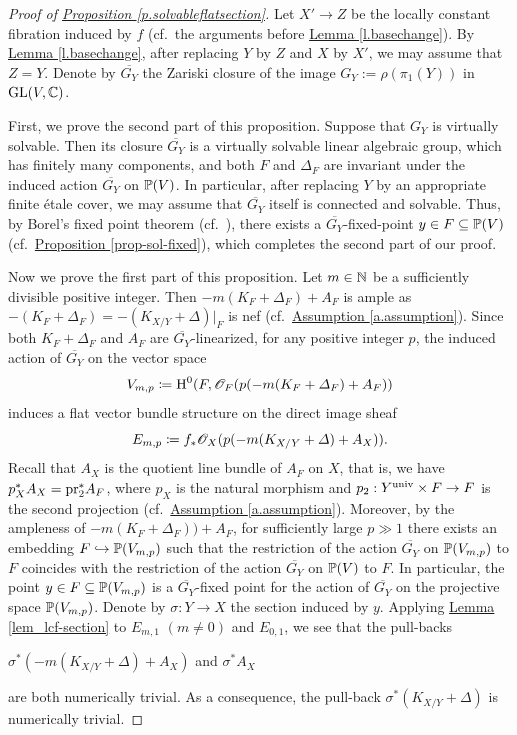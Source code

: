 \begin{proof}[Proof of {\hyperref[p.solvableflatsection]{Proposition  \ref*{p.solvableflatsection}}}]
	Let $X'\rightarrow Z$ be the locally constant fibration induced by $f$ (cf.~the arguments before {\hyperref[l.basechange]{Lemma \ref*{l.basechange}}}). 
	By {\hyperref[l.basechange]{Lemma \ref*{l.basechange}}}, after replacing $Y$ by $Z$ and $X$ by $X'$, we may assume that $Z=Y$. 
	Denote by $\overline{G_Y}$ the Zariski closure of the image $G_Y:=\rho(\pi_1(Y))$ in $\text{GL}(V,\mathbb C)$. 

First, we prove the second part of this proposition. 
Suppose that $G_Y$ is virtually solvable.
Then its closure $\overline{G_Y}$ is a virtually solvable linear algebraic group, which has finitely many components, and both $F$ and $\Delta_F$ are invariant under the induced action $\overline{G_Y}$ on $\mathbb P(V)$. 
	In particular, after replacing $Y$ by an appropriate finite \'etale cover, we may assume that $\overline{G_Y}$ itself is connected and solvable. 
Thus, by Borel's fixed point theorem (cf.~\cite[Theorem 10.4, p.~137]{Bor69}), there exists a $\overline{G_Y}$-fixed-point $y\in F\subseteq  \mathbb P(V)$ (cf.~{\hyperref[prop-sol-fixed]{Proposition  \ref*{prop-sol-fixed}}}), which completes the second part of our proof.
	
Now we prove the first part of this proposition. Let $m\in \mathbb N$ be a sufficiently divisible positive integer. Then $-m(K_F+\Delta_F)+A_F$ is ample as $-(K_{F}+\Delta_F)=-(K_{X/Y}+\Delta)|_F$ is nef (cf.~{\hyperref[a.assumption]{Assumption \ref*{a.assumption}}}). Since both $K_{F}+\Delta_F$ and $A_F$ are $\overline{G_Y}$-linearized, for any positive integer $p$, the induced action of $\overline{G_Y}$ on the vector space
\[
V_{m,p}\coloneqq \operatorname{H}^0(F,\mathscr O_F(p(-m(K_F+\varDelta_F)+A_F))
\]
induces a flat vector bundle structure on the direct image sheaf 
\[
E_{m,p}\coloneqq f_\ast\mathscr O_X(p(-m(K_{X/Y}+\varDelta)+A_X)).
\]
Recall that $A_X$ is the quotient line bundle of $A_F$ on $X$, that is, we have $p_X^*A_X=\textup{pr}_2^*A_F$, where $p_X$ is the natural morphism and $p_2:Y^{\textup{univ}}\times F\rightarrow F$ is the second projection (cf.~{\hyperref[a.assumption]{Assumption \ref*{a.assumption}}}). 	
Moreover, by the ampleness of $-m(K_F+\Delta_F))+A_F$, for sufficiently large $p\gg 1$ there exists an embedding $F\hookrightarrow \mathbb P(V_{m,p})$ such that the restriction of the action $\overline{G_Y}$ on $\mathbb P(V_{m,p})$ to $F$ coincides with the restriction of the action $\overline{G_Y}$ on $\mathbb P(V)$ to $F$. In particular, the point $y\in F\subseteq \mathbb P(V_{m,p})$ is a $\overline{G_Y}$-fixed point for the action of $\overline{G_Y}$ on the projective space $\mathbb P(V_{m,p})$. Denote by $\sigma:Y\rightarrow X$ the section induced by $y$. Applying  {\hyperref[lem_lcf-section]{Lemma \ref*{lem_lcf-section}}} to $E_{m,1}$ $(m\not=0)$ and $E_{0,1}$, we see that the pull-backs
\begin{center}
$\sigma^*(-m(K_{X/Y}+\Delta)+A_X)$ \quad \quad and \quad \quad $\sigma^*A_X$
\end{center}
are both numerically trivial. As a consequence, the pull-back $\sigma^*(K_{X/Y}+\Delta)$ is numerically trivial.
\end{proof}



